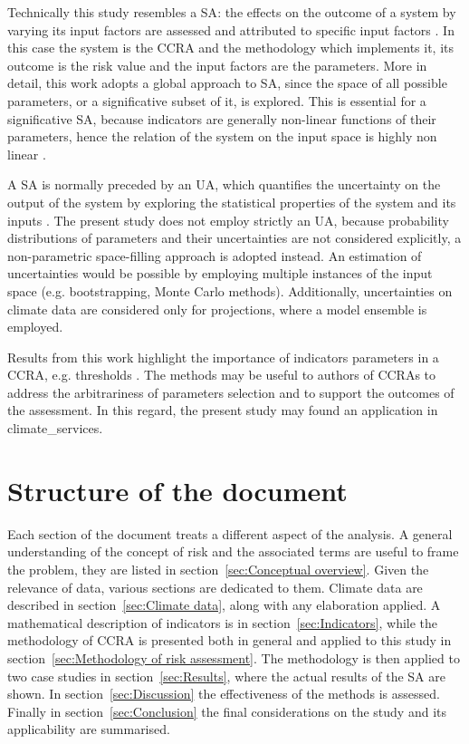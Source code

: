 Technically this study resembles a \gls{SA}: the effects on the outcome of a system by varying its input factors are assessed and attributed to specific input factors \cite[627-632]{2015DeanHandbookOf}. In this case the system is the \gls{CCRA} and the methodology which implements it, its outcome is the \gls{risk} value and the input factors are the parameters.
More in detail, this work adopts a global approach to \gls{SA}, since the space of all possible parameters, or a significative subset of it, is explored. This is essential for a significative \gls{SA}, because \glspl{indicator} are generally non-linear functions of their parameters, hence the relation of the system on the input space is highly non linear \cite[31-32]{2019SaltelliWhySo}.

A \gls{SA} is normally preceded by an \gls{UA}, which quantifies the uncertainty on the output of the system by exploring the statistical properties of the system and its inputs \cite[29-30]{2019SaltelliWhySo}. The present study does not employ strictly an \gls{UA}, because probability distributions of parameters and their uncertainties are not considered explicitly, a non-parametric space-filling approach is adopted instead.
An estimation of uncertainties would be possible by employing multiple instances of the input space (e.g. bootstrapping, Monte Carlo methods). Additionally, uncertainties on climate data are considered only for projections, where a model ensemble is employed.

Results from this work highlight the importance of \glspl{indicator} parameters in a \gls{CCRA}, e.g. thresholds \cite[1873-1874]{2021RanasingheClimateChange}. The methods may be useful to authors of \glspl{CCRA} to address the arbitrariness of parameters selection and to support the outcomes of the assessment. In this regard, the present study may found an application in \glspl{climate_service}.



\section{Structure of the document}
Each section of the document treats a different aspect of the analysis.
A general understanding of the concept of \gls{risk} and the associated terms are useful to frame the problem, they are listed in section~\ref{sec:Conceptual overview}.
Given the relevance of data, various sections are dedicated to them. Climate data are described in section~\ref{sec:Climate data}, along with any elaboration applied. A mathematical description of \glspl{indicator} is in section~\ref{sec:Indicators}, while the methodology of \gls{CCRA} is presented both in general and applied to this study in section~\ref{sec:Methodology of risk assessment}.
The methodology is then applied to two case studies in section~\ref{sec:Results}, where the actual results of the \gls{SA} are shown.
In section~\ref{sec:Discussion} the effectiveness of the methods is assessed.
Finally in section~\ref{sec:Conclusion} the final considerations on the study and its applicability are summarised.
